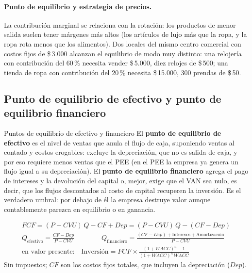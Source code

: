 \paragraph{Punto de equilibrio y estrategia de precios.} La contribución marginal se relaciona con la rotación: los productos de menor salida suelen tener márgenes más altos (los artículos de lujo más que la ropa, y la ropa rota menos que los alimentos). Dos locales del mismo centro comercial con costos fijos de \$\,3.000 alcanzan el equilibrio de modo muy distinto: una relojería con contribución del 60\,\% necesita vender \$\,5.000, diez relojes de \$\,500; una tienda de ropa con contribución del 20\,\% necesita \$\,15.000, 300 prendas de \$\,50.

\subsection{Punto de equilibrio de efectivo y punto de equilibrio financiero}\label{sec:u3-pef}

\begin{definicion}{Puntos de equilibrio de efectivo y financiero}
El \textbf{punto de equilibrio de efectivo} es el nivel de ventas que anula el flujo de caja, suponiendo ventas al contado y costos erogables: excluye la depreciación, que no es salida de caja, y por eso requiere menos ventas que el PEE (en el PEE la empresa ya genera un flujo igual a su depreciación). El \textbf{punto de equilibrio financiero} agrega el pago de intereses y la devolución del capital o, mejor, exige que el VAN sea nulo, es decir, que los flujos descontados al costo de capital recuperen la inversión. Es el verdadero umbral: por debajo de él la empresa destruye valor aunque contablemente parezca en equilibrio o en ganancia.
\end{definicion}

\begin{formulaBox}
\[
\begin{gathered}
FCF = (P - CVU)\,Q - CF + Dep = (P - CVU)\,Q - (CF - Dep)
\\[4pt]
Q_{\text{efectivo}} = \frac{CF - Dep}{P - CVU}
\qquad\qquad
Q_{\text{financiero}} = \frac{(CF - Dep) + \text{Intereses} + \text{Amortización}}{P - CVU}
\\[4pt]
\text{en valor presente:}\quad
\text{Inversión} = FCF\times\frac{(1+WACC)^n - 1}{(1+WACC)^n\,WACC}
\end{gathered}
\]
Sin impuestos; $CF$ son los costos fijos totales, que incluyen la depreciación ($Dep$).
\end{formulaBox}

